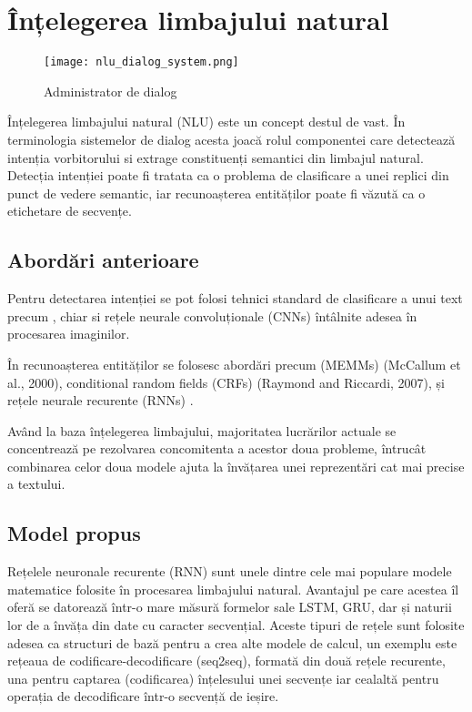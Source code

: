 \section{Înțelegerea limbajului natural}
\begin{figure}[h]
	\centering
	\texttt{[image: nlu\_dialog\_system.png]}
	\caption{Administrator de dialog}
	\label{fig:nlu_ds_proc}
\end{figure}
Înțelegerea limbajului natural (NLU) este un concept destul de vast. În terminologia sistemelor de dialog acesta joacă rolul componentei care detectează intenția vorbitorului si extrage constituenți semantici din limbajul natural.
Detecția intenției poate fi tratata ca o problema de clasificare a unei replici din punct de vedere semantic, iar recunoașterea entităților poate fi văzută ca o etichetare de secvențe.
\subsection{Abordări anterioare}


Pentru detectarea intenției se pot folosi tehnici standard de clasificare a unui text precum \cite{recursive-nn-intent, boosting-intent, boostingplus-intent, att_joint_bing}, chiar si rețele neurale convoluționale (CNNs) \cite{sarika-cnn-crf} întâlnite adesea în procesarea imaginilor. 

În recunoașterea entităților se folosesc abordări precum (MEMMs) (McCallum et al., 2000), conditional random fields (CRFs) (Raymond and Riccardi, 2007), și rețele neurale recurente (RNNs) \cite{mesnil-rnn-crf, rnn-em, deep-lstm}.

Având la baza înțelegerea limbajului, majoritatea lucrărilor actuale se concentrează pe rezolvarea concomitenta a acestor doua probleme, întrucât combinarea celor doua modele ajuta la învățarea unei reprezentări cat mai precise a textului. \cite{recursive-nn-intent, att_joint_bing, joint_online_bing, bi-model}


\subsection{Model propus}

Rețelele neuronale recurente (RNN) sunt unele dintre cele mai populare modele matematice folosite în procesarea limbajului natural. Avantajul pe care acestea îl oferă se datorează într-o mare măsură formelor sale LSTM, GRU, dar și naturii lor de a învăța din date cu caracter secvențial. Aceste tipuri de rețele sunt folosite adesea ca structuri de bază pentru a crea alte modele de calcul, un exemplu este rețeaua de codificare-decodificare (seq2seq), formată din două rețele recurente, una pentru captarea (codificarea) înțelesului unei secvențe iar cealaltă pentru operația de decodificare într-o secvență de ieșire.

